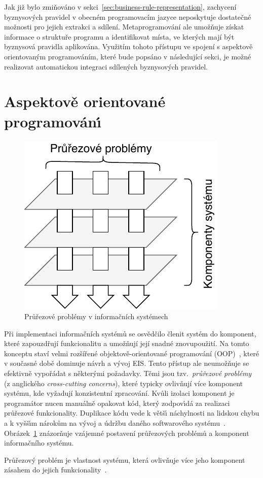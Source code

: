 Jak již bylo zmiňováno v sekci~\ref{sec:business-rule-representation}, zachycení byznysových
pravidel v obecném programovacím jazyce neposkytuje dostatečné možnosti pro jejich extrakci
a sdílení. Metaprogramování ale umožňuje získat informace o struktuře programu a
identifikovat místa, ve kterých mají být byznysová pravidla aplikována. Využitím tohoto
přístupu ve spojení s aspektově orientovaným programováním, které bude popsáno v následující sekci,
je možné realizovat automatickou integraci sdílených byznysových pravidel.

\section{Aspektově orientované programován\'{\i}}\label{sec:aop}

\begin{figure}[t]
    \centering
    \includegraphics[keepaspectratio=true, width=0.30\linewidth]{figures/cross-cutting.pdf}
    \caption{Průřezové problémy v informačních systémech}
    \label{fig:cross-cutting}
\end{figure}

Při implementaci informačních systémů se osvědčilo členit systém do komponent, které
zapouzdřují funkcionalitu a umožňují její snadné znovupoužití. Na tomto konceptu
staví velmi rozšířené objektově-orientované programování (\gls{OOP})~\cite{rentsch1982object},
které v současné době dominuje návrh a vývoj \gls{EIS}. Tento přístup ale neumožňuje se
efektivně vypořádat s některými požadavky.
Těmi jsou tzv.~\textit{průřezové problémy} (z anglického \textit{cross-cutting concerns}),
které typicky ovlivňují více komponent systému, kde vyžadují konzistentní zpracování.
Kvůli izolaci komponent je programátor nucen manuálně opakovat
kód, kter\'y zodpov\'{\i}dá za realizaci průřezové funkcionality. Duplikace kódu
vede k větš\'{\i} náchylnosti na lidskou chybu a k vyšš\'{\i}m nárokům na v\'yvoj
a údržbu daného softwarového systému~\cite{fowler1999refactoring}.
Obrázek~\ref{fig:cross-cutting} znázorňuje vzájemné postavení průřezových
problémů a komponent informačního systému.

\begin{definition}
    Průřezový problém je vlastnost systému, která ovlivňuje více jeho komponent
    zásahem do jejich funkcionality~\cite{kiczales1997aspect}.
\end{definition}

